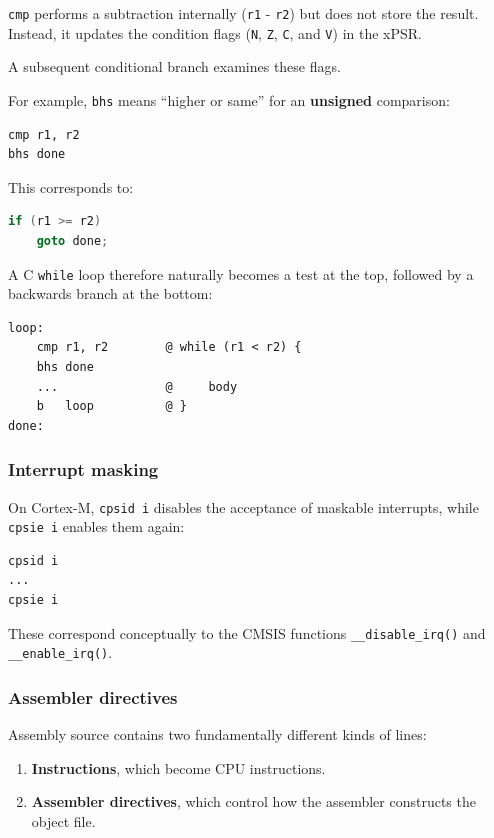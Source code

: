 \documentclass[a4paper,11pt]{article}
\begin{document}
\texttt{cmp} performs a subtraction internally (\texttt{r1} - \texttt{r2}) but does not store the result. Instead, it updates the condition flags
(\texttt{N}, \texttt{Z}, \texttt{C}, and \texttt{V}) in the xPSR.

A subsequent conditional branch examines these flags.

For example, \texttt{bhs} means ``higher or same'' for an \textbf{unsigned}
comparison:

\begin{lstlisting}[language=arm]
cmp r1, r2
bhs done
\end{lstlisting}

This corresponds to:

\begin{lstlisting}[language=C]
if (r1 >= r2)
    goto done;
\end{lstlisting}

A C \texttt{while} loop therefore naturally becomes a test at the top,
followed by a backwards branch at the bottom:

\begin{lstlisting}[language=arm]
loop:
    cmp r1, r2        @ while (r1 < r2) {
    bhs done
    ...               @     body
    b   loop          @ }
done:
\end{lstlisting}

\subsubsection{Interrupt masking}

On Cortex-M, \texttt{cpsid i} disables the acceptance of maskable
interrupts, while \texttt{cpsie i} enables them again:

\begin{lstlisting}[language=arm]
cpsid i
...
cpsie i
\end{lstlisting}

These correspond conceptually to the CMSIS functions
\texttt{\_\_disable\_irq()} and \texttt{\_\_enable\_irq()}.

\subsubsection{Assembler directives}

Assembly source contains two fundamentally different kinds of lines:

\begin{enumerate}
	\item \textbf{Instructions}, which become CPU instructions.
	\item \textbf{Assembler directives}, which control how the assembler
	      constructs the object file.
\end{enumerate}
\end{document}
